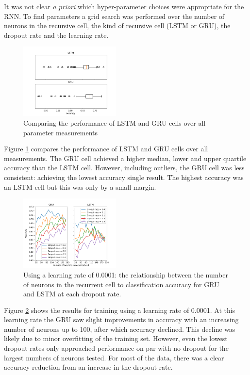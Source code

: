     It was not clear \textit{a priori} which hyper-parameter choices were
    appropriate for the RNN. To find parameters a grid search was performed over
    the number of neurons in the recursive cell, the kind of recursive cell
    (LSTM or GRU), the dropout rate and the learning rate.

    \begin{figure}[ht]
      \includegraphics[width=0.45\textwidth]{Figures/lstm_gru_plot.png}
      \caption{Comparing the performance of LSTM and GRU cells over all
        parameter measurements}
      \label{fig:lstm_gru}
    \end{figure}

    Figure \ref{fig:lstm_gru} compares the performance of LSTM and GRU cells
    over all measurements. The GRU cell achieved a higher
    median, lower and upper quartile accuracy than the LSTM cell. However, including
    outliers, the GRU cell was less consistent: achieving the lowest accuracy
    single result. The highest accuracy was an LSTM cell but this was only by a
    small margin.

    \begin{figure}[ht]
      \includegraphics[width=0.45\textwidth]{Figures/n_neurons_plot-0-0001.png}
      \caption{Using a learning rate of 0.0001: the relationship between the number of neurons in the recurrent
        cell to classification accuracy for GRU and LSTM at each dropout rate.}
      \label{fig:learn_rate_0.0001}
    \end{figure}

    Figure \ref{fig:learn_rate_0.0001} shows the results for training using a
    learning rate of 0.0001. At this learning rate the GRU saw slight improvements in
    accuracy with an increasing number of neurons up to 100, after which
    accuracy declined. This decline was likely due to minor overfitting of the
    training set. However, even the lowest dropout rates only approached
    performance on par with no dropout for the largest numbers of neurons
    tested. For most of the data, there was a clear accuracy reduction from an
    increase in the dropout rate.

